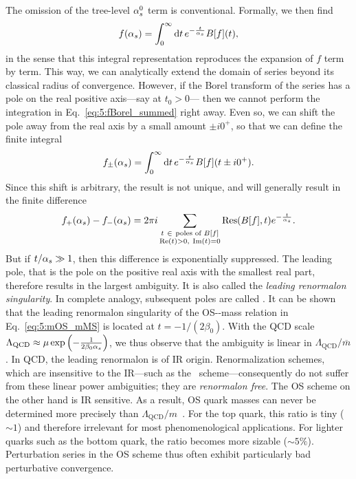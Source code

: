 The omission of the tree-level $\alpha_s^0$ term is conventional. Formally, we then find
\begin{equation}
f(\alpha_s) = \int_0^\infty \mathrm{d} t\, e^{-\frac{t}{\alpha_s}} B[f](t),
\label{eq:5:fBorel_summed}
\end{equation}
in the sense that this integral representation reproduces the expansion of $f$ term by term. This way, we can analytically extend the domain of series beyond its classical radius of convergence. However, if the Borel transform of the series has a pole on the real positive axis---say at $t_0 > 0$--- then we cannot perform the integration in Eq.~\eqref{eq:5:fBorel_summed} right away. Even so, we can shift the pole away from the real axis by a small amount $\pm i 0^+$, so that we can define the finite integral
\begin{equation}
f_\pm(\alpha_s) = \int_0^\infty \mathrm{d} t\, e^{-\frac{t}{\alpha_s}} B[f](t\pm i0^+).
\end{equation}
Since this shift is arbitrary, the result is not unique, and will generally result in the finite difference
\begin{equation}
f_+(\alpha_s) - f_-(\alpha_s) = 2 \pi i \sum_{\substack{t\ \in \ \text{poles of }B[f]\\ \text{Re}(t) > 0,\  \text{Im}(t) =0}} \text{Res}(B[f], t) e^{-\frac{t}{\alpha_s}}.
\end{equation}
But if $t/\alpha_s \gg 1$, then this difference is exponentially suppressed. The leading pole, that is the pole on the positive real axis with the smallest real part, therefore results in the largest ambiguity. It is also called the \textit{leading renormalon singularity}. In complete analogy, subsequent poles are called . It can be shown~\cite{Beneke:1994sw, Bigi:1994em} that the leading renormalon singularity of the \acs{OS}-\MS-mass relation in Eq.~\eqref{eq:5:mOS_mMS} is located at $t = -1/(2 \beta_0)$. With the \acs{QCD} scale $\Lambda_{\text{QCD}} \approx \mu \exp\left(-\frac{1}{2\beta_0 \alpha_s} \right)$, we thus observe that the ambiguity is linear in $\Lambda_{\text{QCD}}/\overline{m}$. In \acs{QCD}, the leading renormalon is of \acs{IR} origin. Renormalization schemes, which are insensitive to the \acs{IR}---such as the \MS\ scheme---consequently do not suffer from these linear power ambiguities; they are \textit{renormalon free}. The \acs{OS} scheme on the other hand is \acs{IR} sensitive. As a result, \acs{OS} quark masses can never be determined more precisely than $\Lambda_{\text{QCD}}/m$~\cite{Bigi:1993zi}. For the top quark, this ratio is tiny ($\sim 1$\textperthousand) and therefore irrelevant for most phenomenological applications. For lighter quarks such as the bottom quark, the ratio becomes more sizable ($\sim5\%$). Perturbation series in the \acs{OS} scheme thus often exhibit particularly bad perturbative convergence.

